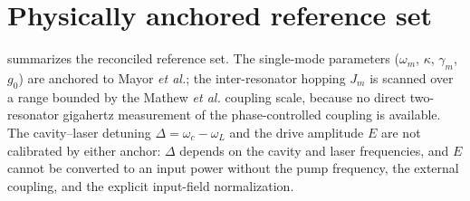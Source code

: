 \documentclass[preprint,numbers,a4paper]{elsarticle}
\begin{document}
\section{Physically anchored reference set}
\label{SI-sec:anchored-reference}

 summarizes the reconciled reference set. The single-mode parameters ($\omega_m$, $\kappa$, $\gamma_m$, $g_0$) are anchored to Mayor \emph{et al.}; the inter-resonator hopping $J_m$ is scanned over a range bounded by the Mathew \emph{et al.} coupling scale, because no direct two-resonator gigahertz measurement of the phase-controlled coupling is available. The cavity--laser detuning $\Delta=\omega_c-\omega_L$ and the drive amplitude $E$ are not calibrated by either anchor: $\Delta$ depends on the cavity and laser frequencies, and $E$ cannot be converted to an input power without the pump frequency, the external coupling, and the explicit input-field normalization.

\begin{table}[h]
  \centering
  \caption{Physically anchored reference parameter set for the one-optical/two-mechanical optomechanical model of the main text. Normalized values are in units of the reference mechanical frequency $\omega_m=2\pi\times\qty{7.436}{\giga\hertz}$. The reference operating point used for the numerical validation of the main text is shown for comparison and is not a calibrated device.}
  \label{SI-tab:si-calibrated}
\end{table}
\end{document}
